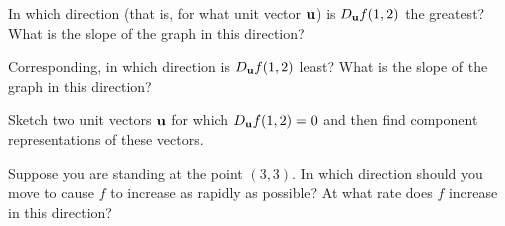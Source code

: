\begin{activity}
\item 
 In which direction (that is, for what unit vector $\mathbf{u}$) is $D_{\mathbf{u}}f(1,2)$
  the greatest?  What is the slope of the graph in this direction?

\item Corresponding, in which direction is $D_{\mathbf{u}}f(1,2)$ least?  What is the slope of the graph in this direction?

\item Sketch two unit vectors $\mathbf{u}$ for which $D_{\mathbf{u}}f(1,2) = 0$ and
  then find component representations of these vectors.

\item Suppose you are standing at the point $(3,3)$.  In which
  direction should you move to cause $f$ to increase as rapidly as
  possible?  At what rate does $f$ increase in this direction?

  \ea

\end{activity}

